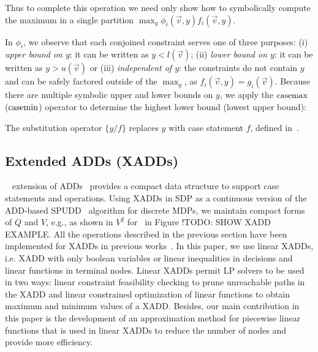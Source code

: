  Thus to complete this operation we need only
show how to symbolically compute the maximum in a single partition 
$\max_y \phi_i(\vec{v},y) f_i(\vec{v},y)$.

In $\phi_i$, we observe that each conjoined constraint serves one of
three purposes: (i) \emph{upper bound on $y$}: it can be written
as $y < l(\vec{v})$; (ii) \emph{lower bound on $y$}: it can be written as $y >
u(\vec{v})$ or (iii) \emph{independent of $y$}: the constraints do not contain $y$
and can be safely factored outside of the $\max_y$, as $f_i(\vec{v},y) =  g_i(\vec{v})$.  
Because there are multiple symbolic upper and lower
bounds on $y$, we apply the $\mathrm{casemax}$ ($\mathrm{casemin}$) operator to determine the highest lower bound (lowest upper bound):

The substitution operator $\{ y / f \}$ replaces $y$ with case statement $f$, 
defined in~\cite{sanner_uai11}.

\subsection {\bf Extended ADDs (XADDs)}
~\cite{sanner_uai11} extension of
ADDs~\cite{bahar93add} provides a compact data structure to support
case statements and operations.  Using XADDs in SDP as a continuous
version of the ADD-based SPUDD~\cite{spudd} algorithm for
discrete MDPs, we maintain compact forms of $Q$ and $V$, e.g., as
shown in $V^2$ for \MarsRover\ in Figure !TODO: SHOW XADD EXAMPLE.  All the operations described in the previous section have been implemented for XADDs in previous works~\cite{sanner_uai11}. In this paper, we use linear XADDs, i.e. XADD with only boolean variables or linear inequalities in decisions and linear functions in terminal nodes. Linear XADDs permit LP solvers to be used in two ways: linear constraint feasibility checking to prune unreachable paths in the XADD and linear constrained optimization of linear functions to obtain maximum and minimum values of a XADD. Besides, our main contribution in this paper is the development of an approximation method for piecewise linear functions that is used in linear XADDs to reduce the number of nodes and provide more efficiency.